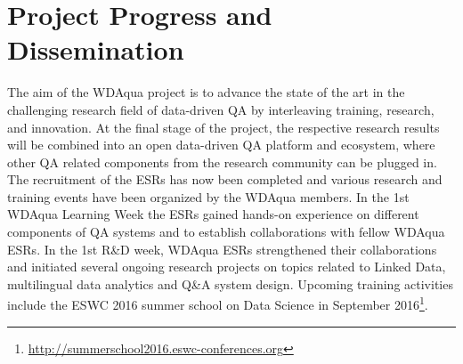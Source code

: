 \documentclass[a4paper]{llncs}
\newcommand{\christoph}[1]{\todo{Christoph: #1}}
\begin{document}
	\section{Project Progress and Dissemination} \label{sec:progress}
	The aim of the WDAqua project is to advance the state of the art in the challenging research field of data-driven QA by interleaving training, research, and innovation.
    At the final stage of the project, the respective research results will be combined into an open data-driven QA platform and ecosystem, where other QA related components from the research community can be plugged in.
    The recruitment of the ESRs has now been completed and various research and training events have been organized by the WDAqua members.
    In the 1st WDAqua Learning Week the ESRs gained hands-on experience on different components of QA systems and to establish collaborations with fellow WDAqua ESRs.
    In the 1st R\&D week, WDAqua ESRs strengthened their collaborations and initiated several ongoing research projects on topics related to Linked Data, multilingual data analytics and Q\&A system design.
    Upcoming training activities include the ESWC 2016 summer school on Data Science in September 2016\footnote{\url{http://summerschool2016.eswc-conferences.org}}.	
\end{document}
